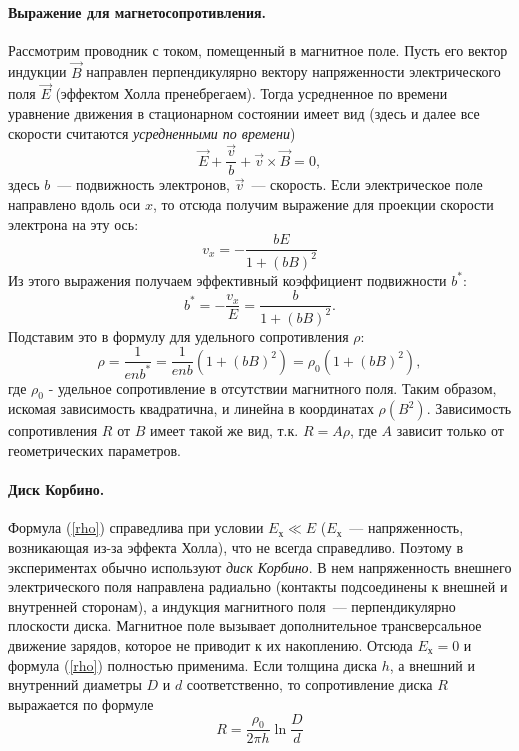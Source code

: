 \documentclass[12pt,a4paper]{article}
\begin{document}
\paragraph{Выражение для магнетосопротивления.} Рассмотрим проводник с током, помещенный в магнитное поле. Пусть его вектор индукции $\vec{B}$ направлен перпендикулярно вектору напряженности электрического поля $\vec{E}$ (эффектом Холла пренебрегаем). Тогда усредненное по времени уравнение движения в стационарном состоянии имеет вид (здесь и далее все скорости считаются \emph{усредненными по времени})
\begin{equation}
\vec{E} + \frac{\vec{v}}{b} + \vec{v}\times\vec{B} = 0\label{eq},
\end{equation}
здесь $b$~--- подвижность электронов, $\vec{v}$~--- скорость. Если электрическое поле направлено вдоль оси $x$, то отсюда получим выражение для проекции скорости электрона на эту ось:
\begin{equation}
v_x = -\frac{bE}{1+\left(bB\right)^2}
\end{equation}
Из этого выражения получаем эффективный коэффициент подвижности $b^*$:
\begin{equation}
b^* = -\frac{v_x}{E} = \frac{b}{1+\left(bB\right)^2}\label{eff}.
\end{equation}
Подставим это в формулу для удельного сопротивления $\rho$:
\begin{equation}
\rho = \frac{1}{enb^*} = \frac{1}{enb}\left(1+\left(bB\right)^2\right) = \rho_0\left(1+\left(bB\right)^2\right)\label{rho}, 
\end{equation}
где $\rho_0$ - удельное сопротивление в отсутствии магнитного поля. Таким образом, искомая зависимость квадратична, и линейна в координатах $\rho\left(B^2\right)$. Зависимость сопротивления $R$ от $B$ имеет такой же вид, т.к. $R = A\rho$, где $A$ зависит только от геометрических параметров.
\paragraph{Диск Корбино.} Формула (\ref{rho}) справедлива при условии $E_\text{х} \ll E$ ($E_\text{х}$~--- напряженность, возникающая из-за эффекта Холла), что не всегда справедливо. Поэтому в экспериментах обычно используют \emph{диск Корбино}. В нем напряженность внешнего электрического поля направлена радиально (контакты подсоединены к внешней и внутренней сторонам), а индукция магнитного поля~--- перпендикулярно плоскости диска. Магнитное поле вызывает дополнительное трансверсальное движение зарядов, которое не приводит к их накоплению. Отсюда $E_\text{х} = 0$ и формула (\ref{rho}) полностью применима. Если толщина диска $h$, а внешний и внутренний диаметры $D$ и $d$ соответственно, то сопротивление диска $R$ выражается по формуле
\begin{equation}
R = \frac{\rho_0}{2\pi h}\ln\frac{D}{d}
\end{equation}
\end{document}
